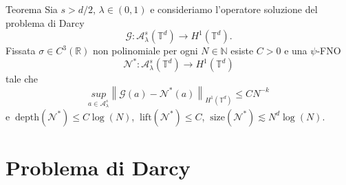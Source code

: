\documentclass{beamer}
\newcommand{\numberset}{\mathbb}
\newcommand{\N}{\numberset{N}}
\newcommand{\R}{\numberset{R}}
\begin{document}
\begin{frame}
	\vspace{-0.2cm}
	\begin{themedTitleBlock}{Teorema} %
		Sia $ s > d/2 $, $ \lambda \in (0,1) $ e consideriamo l'operatore soluzione del problema di Darcy
		\[ \mathcal{G}: \mathcal{A}_{\lambda}^{s}(\mathbb{T}^d) \to H^1(\mathbb{T}^d). \]
		Fissata $ \sigma \in C^3(\R) $ non polinomiale per ogni $ N \in \N $ esiste $ C > 0 $ e una $ \psi $-FNO
		\[ \mathcal{N}^{*}: \mathcal{A}_{\lambda}^{s}(\mathbb{T}^d) \to H^1(\mathbb{T}^d)  \]
		tale che
		\[ \underset{a \in \mathcal{A}_{\lambda}^{s}}{sup} \left\| \mathcal{G}(a) - \mathcal{N}^{*}(a) \right\|_{H^1(\mathbb{T}^d)} \le CN^{-k} \]
		e $\ \mathrm{depth}(\mathcal{N}^{*}) \le C \log(N) $, $\  \mathrm{lift}(\mathcal{N}^{*}) \le C $, $\ \mathrm{size}(\mathcal{N}^{*}) \lesssim N^d\log(N). $
	\end{themedTitleBlock}
\end{frame}

\section{Problema di Darcy}
\end{document}
